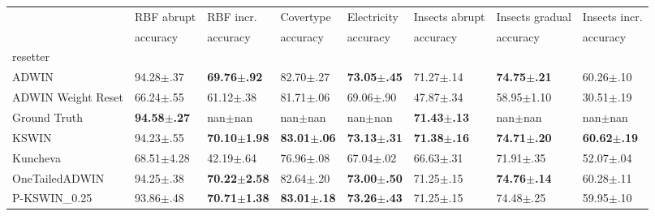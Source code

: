 \begin{tabular}{llllllll}
    \toprule
                       & RBF abrupt              & RBF incr.                & Covertype               & Electricity             & Insects abrupt          & Insects gradual         & Insects incr.           \\
                       & accuracy                & accuracy                 & accuracy                & accuracy                & accuracy                & accuracy                & accuracy                \\
    resetter           &                         &                          &                         &                         &                         &                         &                         \\
    \midrule
    ADWIN              & 94.28$\pm$.37           & \bfseries 69.76$\pm$.92  & 82.70$\pm$.27           & \bfseries 73.05$\pm$.45 & 71.27$\pm$.14           & \bfseries 74.75$\pm$.21 & 60.26$\pm$.10           \\
    ADWIN Weight Reset & 66.24$\pm$.55           & 61.12$\pm$.38            & 81.71$\pm$.06           & 69.06$\pm$.90           & 47.87$\pm$.34           & 58.95$\pm$1.10          & 30.51$\pm$.19           \\
    Ground Truth       & \bfseries 94.58$\pm$.27 & nan$\pm$nan              & nan$\pm$nan             & nan$\pm$nan             & \bfseries 71.43$\pm$.13 & nan$\pm$nan             & nan$\pm$nan             \\
    KSWIN              & 94.23$\pm$.55           & \bfseries 70.10$\pm$1.98 & \bfseries 83.01$\pm$.06 & \bfseries 73.13$\pm$.31 & \bfseries 71.38$\pm$.16 & \bfseries 74.71$\pm$.20 & \bfseries 60.62$\pm$.19 \\
    Kuncheva           & 68.51$\pm$4.28          & 42.19$\pm$.64            & 76.96$\pm$.08           & 67.04$\pm$.02           & 66.63$\pm$.31           & 71.91$\pm$.35           & 52.07$\pm$.04           \\
    OneTailedADWIN     & 94.25$\pm$.38           & \bfseries 70.22$\pm$2.58 & 82.64$\pm$.20           & \bfseries 73.00$\pm$.50 & 71.25$\pm$.15           & \bfseries 74.76$\pm$.14 & 60.28$\pm$.11           \\
    P-KSWIN_0.25       & 93.86$\pm$.48           & \bfseries 70.71$\pm$1.38 & \bfseries 83.01$\pm$.18 & \bfseries 73.26$\pm$.43 & 71.25$\pm$.15           & 74.48$\pm$.25           & 59.95$\pm$.10           \\
    \bottomrule
\end{tabular}
